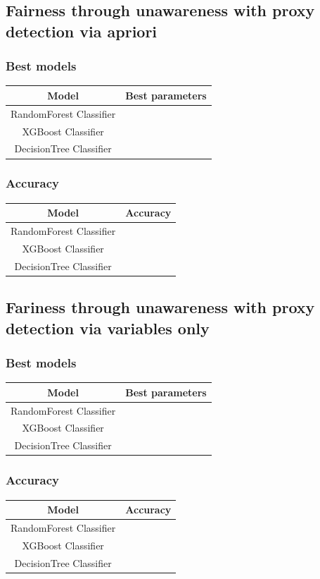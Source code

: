 \documentclass[12pt,a4paper,openright,twoside]{book}
\begin{document}
\subsection{Fairness through unawareness with proxy detection via apriori}
\subsubsection{Best models}
\begin{tabular}{|c|c|}
    \hline
    \textbf{Model} & \textbf{Best parameters} \\
    \hline
    RandomForest Classifier  &  \\
    \hline
    XGBoost Classifier & \\
    \hline
    DecisionTree Classifier &  \\
    \hline
\end{tabular}

\subsubsection{Accuracy}
\begin{tabular}{|c|c|}
    \hline
    \textbf{Model} & \textbf{Accuracy} \\
    \hline
    RandomForest Classifier  &  \\
    \hline
    XGBoost Classifier & \\
    \hline
    DecisionTree Classifier &  \\
    \hline
\end{tabular}

\subsection{Fariness through unawareness with proxy detection via variables only}
\subsubsection{Best models}
\begin{tabular}{|c|c|}
    \hline
    \textbf{Model} & \textbf{Best parameters} \\
    \hline
    RandomForest Classifier  &  \\
    \hline
    XGBoost Classifier & \\
    \hline
    DecisionTree Classifier &  \\
    \hline
\end{tabular}

\subsubsection{Accuracy}
\begin{tabular}{|c|c|}
    \hline
    \textbf{Model} & \textbf{Accuracy} \\
    \hline
    RandomForest Classifier  &  \\
    \hline
    XGBoost Classifier & \\
    \hline
    DecisionTree Classifier &  \\
    \hline
\end{tabular}
\end{document}
